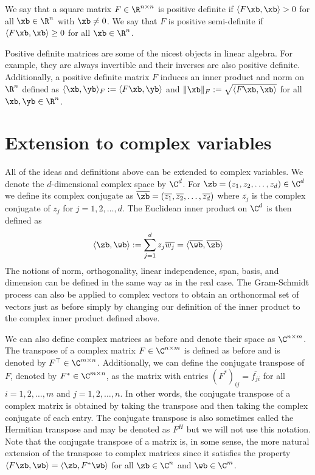 \begin{definition}
    We say that a square matrix $F \in \R^{n \times n}$ is positive definite if $\langle F \xb, \xb \rangle > 0$ for all $\xb \in \R^n$ with $\xb \neq 0$. We say that $F$ is positive semi-definite if $\langle F \xb, \xb \rangle \ge 0$ for all $\xb \in \R^n$.
\end{definition}

Positive definite matrices are some of the nicest objects in linear algebra. For example, 
they are always invertible and their inverses are also positive definite. Additionally, 
a positive definite matrix $F$ induces an inner product and norm on $\R^n$ defined as $\langle \xb, \yb \rangle_F := \langle F \xb, \yb \rangle$ and $\|\xb\|_F := \sqrt{\langle F \xb, \xb \rangle}$ for all $\xb, \yb \in \R^n$.

\section{Extension to complex variables}

All of the ideas and definitions above can be extended to complex variables. We denote the $d$-dimensional complex space by $\C^d$. For $\zb = (z_1, z_2, \ldots, z_d) \in \C^d$ we define its complex conjugate as $\overline{\zb} = (\overline{z_1}, \overline{z_2}, \ldots, \overline{z_d})$ where $\overline{z_j}$ is the complex conjugate of $z_j$ for $j=1,2,\ldots,d$. The Euclidean inner product on $\C^d$ is then defined as 
\begin{equation*}
    \langle \zb, \wb \rangle := \sum_{j=1}^d z_j \overline{w_j} = \langle \overline{\wb}, \overline{\zb} \rangle
\end{equation*}
The notions of norm, orthogonality, linear independence, span, basis, and dimension can be defined in the same way as in the real case. The Gram-Schmidt process can also be applied to complex vectors to obtain an orthonormal set of vectors just as before simply by 
changing our definition of the inner product to the complex inner product defined above.

We can also define complex matrices as before and denote their space as $\C^{n \times m}$. The transpose of a complex matrix $F \in \C^{n \times m}$ is defined as before and is denoted by $F^\top \in \C^{m \times n}$. Additionally, we can define the conjugate transpose of $F$, denoted by $F^* \in \C^{m \times n}$, as the matrix with entries $(F^*)_{ij} = \overline{f_{ji}}$ for all $i=1,2,\ldots,m$ and $j=1,2,\ldots,n$. In other words, the conjugate transpose of a complex matrix is obtained by taking the transpose and then taking the complex conjugate of each entry. The conjugate transpose is also sometimes called the Hermitian transpose and may be denoted as $F^H$ but we will not use this notation. Note that the conjugate transpose of a matrix 
is, in some sense, the more natural extension of the transpose to complex matrices since it satisfies the property $\langle F \zb, \wb \rangle = \langle \zb, F^* \wb \rangle$ for all $\zb \in \C^n$ and $\wb \in \C^m$.

